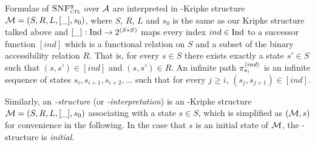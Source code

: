 \documentclass[letterpaper]{article}
\begin{document}
Formulae of ${\textsc{SNF}_{\textsc{ctl}}^g}$ over ${\cal A}$ are interpreted in \Ind-Kripke structure ${\cal M}=(S,R,L, [\_], s_0)$, where $S$, $R$, $L$ and $s_0$ is the same as our Kripke structure talked above and $[\_]: \textrm{Ind} \rightarrow 2^{(S*S)}$ maps every index $ind \in \textrm{Ind}$ to a successor function $[ind]$ which is a functional relation on $S$ and a subset of the binary accessibility relation $R$. That is, for every $s\in S$ there exists exactly a state $s'\in S$ such that $(s,s')\in [ind]$ and $(s,s')\in R$.
An infinite path $\pi_{s_i}^{{\langle{ind}\rangle}}$ is an infinite sequence of states $s_i, s_{i+1}, s_{i+2},\dots$ such that for every $j\geq i$, $(s_j, s_{j+1})\in [ind]$.

Similarly, an {\em \Ind-structure} (or {\em \Ind-interpretation}) is an \Ind-Kripke structure
${\cal M}=(S, R, L, [\_], s_0)$ associating
with a state $s\in S$, which is simplified as $({\cal M},s)$ for convenience in the following.
In the case that $s$ is an initial state of $\cal M$, the \Ind-structure is {\em initial}.
\end{document}
